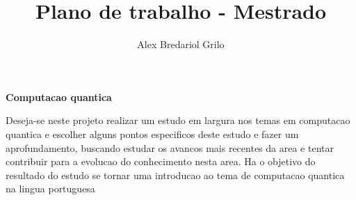 \documentclass[a4paper,10pt]{article}
\title{Plano de trabalho - Mestrado}
\author{Alex Bredariol Grilo}
\begin{document}
\maketitle

\textbf{Computacao quantica}

Deseja-se neste projeto realizar um estudo em largura nos temas em computacao quantica e
escolher alguns pontos especificos deste estudo e fazer um aprofundamento, buscando
estudar os avancos mais recentes da area e tentar contribuir para a
evolucao do conhecimento nesta area. Ha o objetivo do resultado do estudo se tornar uma introducao ao tema de computacao
quantica na lingua portuguesa
\end{document}

